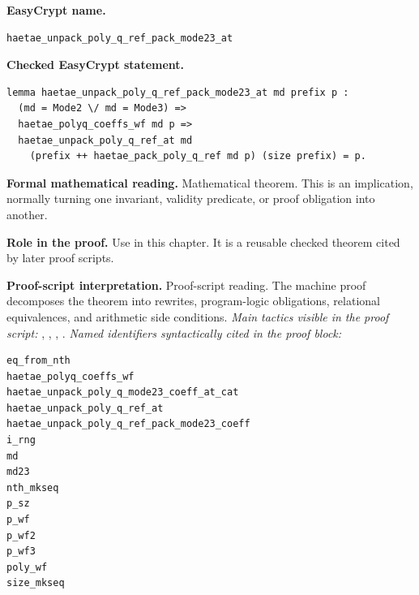 \begin{formaltheorem}
\noindent\textbf{EasyCrypt name.}
\begin{lstlisting}[language=EasyCrypt,basicstyle=\ttfamily\scriptsize]
haetae_unpack_poly_q_ref_pack_mode23_at
\end{lstlisting}
\noindent\textbf{Checked EasyCrypt statement.}
\begin{lstlisting}[language=EasyCrypt,basicstyle=\ttfamily\scriptsize]
lemma haetae_unpack_poly_q_ref_pack_mode23_at md prefix p :
  (md = Mode2 \/ md = Mode3) =>
  haetae_polyq_coeffs_wf md p =>
  haetae_unpack_poly_q_ref_at md
    (prefix ++ haetae_pack_poly_q_ref md p) (size prefix) = p.
\end{lstlisting}
\noindent\textbf{Formal mathematical reading.}
Mathematical theorem. This is an implication, normally turning one invariant, validity predicate, or proof obligation into another.

\noindent\textbf{Role in the proof.}
Use in this chapter. It is a reusable checked theorem cited by later proof scripts.

\noindent\textbf{Proof-script interpretation.}
Proof-script reading. The machine proof decomposes the theorem into rewrites, program-logic obligations, relational equivalences, and arithmetic side conditions.
\emph{Main tactics visible in the proof script:} , , , .
\emph{Named identifiers syntactically cited in the proof block:}
\begin{lstlisting}[language=EasyCrypt,basicstyle=\ttfamily\scriptsize]
eq_from_nth
haetae_polyq_coeffs_wf
haetae_unpack_poly_q_mode23_coeff_at_cat
haetae_unpack_poly_q_ref_at
haetae_unpack_poly_q_ref_pack_mode23_coeff
i_rng
md
md23
nth_mkseq
p_sz
p_wf
p_wf2
p_wf3
poly_wf
size_mkseq
\end{lstlisting}

\end{formaltheorem}

